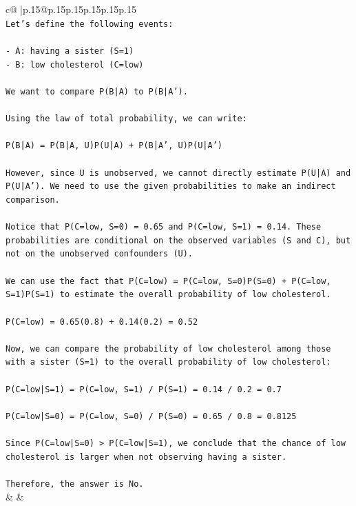 \documentclass{article}
\begin{document}
{\begin{supertabular}{c@{$\;$}|p{.15\linewidth}@{}p{.15\linewidth}p{.15\linewidth}p{.15\linewidth}p{.15\linewidth}p{.15\linewidth}}
{{{\\ 
\texttt{Let's define the following events:} \\
\\ 
\texttt{{-} A: having a sister (S=1)} \\
\texttt{{-} B: low cholesterol (C=low)} \\
\\ 
\texttt{We want to compare P(B|A) to P(B|A').} \\
\\ 
\texttt{Using the law of total probability, we can write:} \\
\\ 
\texttt{P(B|A) = P(B|A, U)P(U|A) + P(B|A', U)P(U|A')} \\
\\ 
\texttt{However, since U is unobserved, we cannot directly estimate P(U|A) and P(U|A'). We need to use the given probabilities to make an indirect comparison.} \\
\\ 
\texttt{Notice that P(C=low, S=0) = 0.65 and P(C=low, S=1) = 0.14. These probabilities are conditional on the observed variables (S and C), but not on the unobserved confounders (U).} \\
\\ 
\texttt{We can use the fact that P(C=low) = P(C=low, S=0)P(S=0) + P(C=low, S=1)P(S=1) to estimate the overall probability of low cholesterol.} \\
\\ 
\texttt{P(C=low) = 0.65(0.8) + 0.14(0.2) = 0.52} \\
\\ 
\texttt{Now, we can compare the probability of low cholesterol among those with a sister (S=1) to the overall probability of low cholesterol:} \\
\\ 
\texttt{P(C=low|S=1) = P(C=low, S=1) / P(S=1) = 0.14 / 0.2 = 0.7} \\
\\ 
\texttt{P(C=low|S=0) = P(C=low, S=0) / P(S=0) = 0.65 / 0.8 = 0.8125} \\
\\ 
\texttt{Since P(C=low|S=0) > P(C=low|S=1), we conclude that the chance of low cholesterol is larger when not observing having a sister.} \\
\\ 
\texttt{Therefore, the answer is No.} \\
            }
        }
    }
    & & \\ \\


\end{supertabular}}
\end{document}
